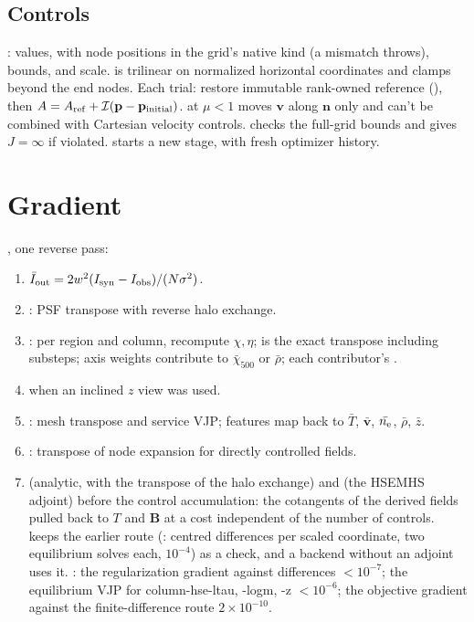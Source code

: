 \subsection{Controls}
:  values, with node positions in the grid's native kind (a mismatch throws), bounds, and scale.  is trilinear on normalized horizontal coordinates and clamps beyond the end nodes. Each trial: restore immutable rank-owned reference (), then $A=A_{\rm ref}+\mathcal I(\mathbf p-\mathbf p_{\rm initial})$.  at $\mu<1$ moves $\mathbf v$ along $\mathbf n$ only and can't be combined with Cartesian velocity controls.  checks the full-grid bounds and gives $J=\infty$ if violated.  starts a new stage, with fresh optimizer history.

\section{Gradient}
, one reverse pass:
\begin{enumerate}
\item $\bar I_{\rm out}=2w^2(I_{\rm syn}-I_{\rm obs})/(N\sigma^2)$.
\item {}: PSF transpose with reverse halo exchange.
\item {}: per region and column, recompute $\chi,\eta$;  is the exact transpose including substeps; axis weights contribute to $\bar\chi_{500}$ or $\bar\rho$; each contributor's .
\item {} when an inclined $z$ view was used.
\item {}: mesh transpose and service VJP; features map back to $\bar T$, $\bar{\mathbf v}$, $\bar{n_{\rm e}}$, $\bar\rho$, $\bar z$.
\item {}: transpose of node expansion for directly controlled fields.
\item {} (analytic, with the transpose of the halo exchange) and  (the HSEMHS adjoint) before the control accumulation: the cotangents of the derived fields pulled back to $T$ and $\mathbf B$ at a cost independent of the number of controls.  keeps the earlier route (: centred differences per scaled coordinate, two equilibrium solves each,  $10^{-4}$) as a check, and a backend without an adjoint uses it. : the regularization gradient against differences $<10^{-7}$; the equilibrium VJP for column-hse-ltau, -logm, -z $<10^{-6}$; the objective gradient against the finite-difference route $2\times10^{-10}$.
\end{enumerate}

